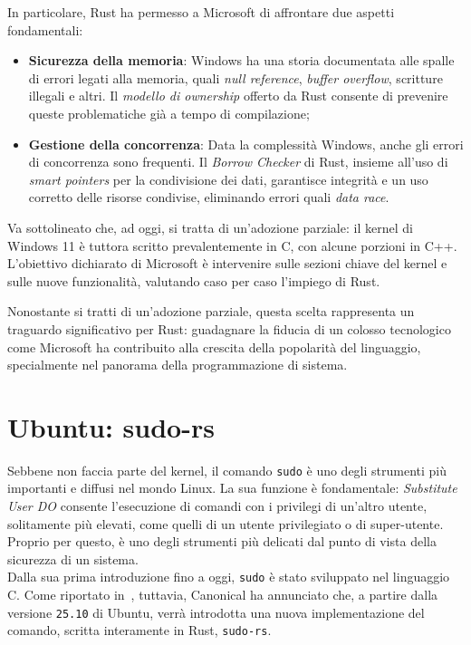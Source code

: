 In particolare, Rust ha permesso a Microsoft di affrontare due aspetti fondamentali:
\begin{itemize}
    \item \textbf{Sicurezza della memoria}: Windows ha una storia documentata alle spalle di errori legati alla memoria, quali \textit{null reference}, \textit{buffer overflow}, scritture illegali e altri. Il \textit{modello di ownership} offerto da Rust consente di prevenire queste problematiche già a tempo di compilazione;
    \item \textbf{Gestione della concorrenza}: Data la complessità Windows, anche gli errori di concorrenza sono frequenti. Il \textit{Borrow Checker} di Rust, insieme all'uso di \textit{smart pointers} per la condivisione dei dati, garantisce integrità e un uso corretto delle risorse condivise, eliminando errori quali \textit{data race}.
\end{itemize}
Va sottolineato che, ad oggi, si tratta di un'adozione parziale: il kernel di Windows 11 è tuttora scritto prevalentemente in C, con alcune porzioni in C++.
L'obiettivo dichiarato di Microsoft è intervenire sulle sezioni chiave del kernel e sulle nuove funzionalità, valutando caso per caso l'impiego di Rust.

Nonostante si tratti di un'adozione parziale, questa scelta rappresenta un traguardo significativo per Rust: guadagnare la fiducia
di un colosso tecnologico come Microsoft ha contribuito alla crescita della popolarità del linguaggio, specialmente nel panorama della programmazione di sistema.

\section{Ubuntu: sudo-rs}
Sebbene non faccia parte del kernel, il comando \texttt{sudo} è uno degli strumenti più importanti e diffusi nel mondo Linux.
La sua funzione è fondamentale: \textit{Substitute User DO} consente l'esecuzione di comandi con i privilegi di un'altro utente, solitamente più elevati,
come quelli di un utente privilegiato o di super-utente.
Proprio per questo, è uno degli strumenti più delicati dal punto di vista della sicurezza di un sistema. \hfill
\vspace{5pt}\\
\noindent Dalla sua prima introduzione fino a oggi, \texttt{sudo} è stato sviluppato nel linguaggio C. Come riportato in~\cite{ubuntu-sudo-rs}, tuttavia, Canonical ha annunciato che,
a partire dalla versione \texttt{25.10} di Ubuntu, verrà introdotta una nuova implementazione del comando, scritta interamente in Rust, \texttt{sudo-rs}.

